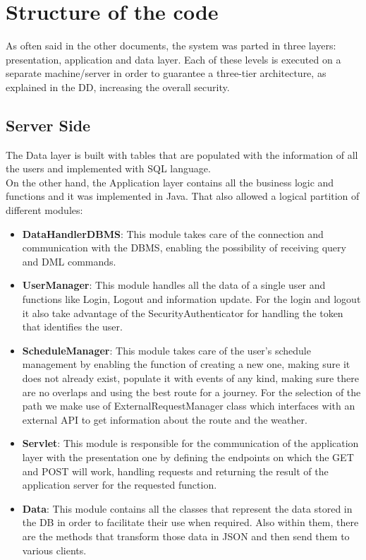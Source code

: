 \documentclass[numbers=noenddot, 12pt, a4paper, oneside]{scrbook}
\begin{document}
\chapter{Structure of the code}


As often said in the other documents, the system was parted in three layers: presentation, application and data layer. Each of these levels is executed on a separate machine/server in order to guarantee a three-tier architecture, as explained in the DD, increasing the overall security.\\

\section*{Server Side}
\lstset{language=Java}
The Data layer is built with tables that are populated with the information of all the users and implemented with SQL language.\\
On the other hand, the Application layer contains all the business logic and functions and it was implemented in Java. That also allowed a logical partition of different modules:
\begin{itemize}
	\item \textbf{DataHandlerDBMS}: This module takes care of the connection and communication with the DBMS, enabling the possibility of receiving query and DML commands.
	\item \textbf{UserManager}: This module handles all the data of a single user and functions like Login, Logout and information update. For the login and logout it also take advantage of the SecurityAuthenticator for handling the token that identifies the user.
	\item \textbf{ScheduleManager}: This module takes care of the user's schedule management by enabling the function of creating a new one, making sure it does not already exist, populate it with events of any kind, making sure there are no overlaps and using the best route for a journey. For the selection of the path we make use of ExternalRequestManager class which interfaces with an external API to get information about the route and the weather.
	\item \textbf{Servlet}: This module is responsible for the communication of the application layer with the presentation one by defining the endpoints on which the GET and POST will work, handling requests and returning the result of the application server for the requested function.
	\item \textbf{Data}: This module contains all the classes that represent the data stored in the DB in order to facilitate their use when required. Also within them, there are the methods that transform those data in JSON and then send them to various clients.
\end{itemize}
\end{document}
